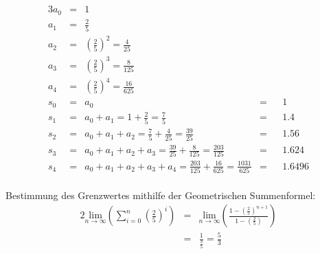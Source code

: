 \documentclass[10pt,a4paper,oneside,ngerman,numbers=noenddot]{scrartcl}
\begin{document}
\subsection{} %
\subsubsection{} %
\begin{alignat*}{3}
a_{0} &=& 1 &&&\\
a_{1} &=& \frac{2}{5} &&& \\
a_{2} &=& \left(\frac{2}{5}\right)^{2} = \frac{4}{25} &&& \\
a_{3} &=& \left(\frac{2}{5}\right)^{3} = \frac{8}{125} &&& \\
a_{4} &=& \left(\frac{2}{5}\right)^{4} = \frac{16}{625} &&& \\
s_{0} &=& a_{0} &=&& 1 \\
s_{1} &=& a_{0} + a_{1} = 1 + \frac{2}{5} = \frac{7}{5} &=&& 1.4 \\
s_{2} &=& a_{0} + a_{1} + a_{2} = \frac{7}{5} + \frac{4}{25} = \frac{39}{25} &=&& 1.56 \\
s_{3} &=& a_{0} + a_{1} + a_{2} + a_{3} = \frac{39}{25} + \frac{8}{125} = \frac{203}{125} &=&& 1.624 \\
s_{4}&=& a_{0} + a_{1} + a_{2} + a_{3} + a_{4} = \frac{203}{125} + \frac{16}{625} = \frac{1031}{625} &=&& 1.6496
\end{alignat*}\\
Bestimmung des Grenzwertes mithilfe der Geometrischen Summenformel:\\
\begin{alignat*}{2}
\underset{n \rightarrow \infty}{\text{lim}} \left( \sum\limits_{i=0}^{n} \left(\frac{2}{5}\right)^{i} \right) &=& \underset{n \rightarrow \infty}{\text{lim}} \left(\frac{1-\left(\frac{2}{5}\right)^{n+1}}{1-\left(\frac{2}{5}\right)} \right) \\
&=& \frac{1}{\frac{3}{5}} = \frac{5}{3}
\end{alignat*}
\end{document}
